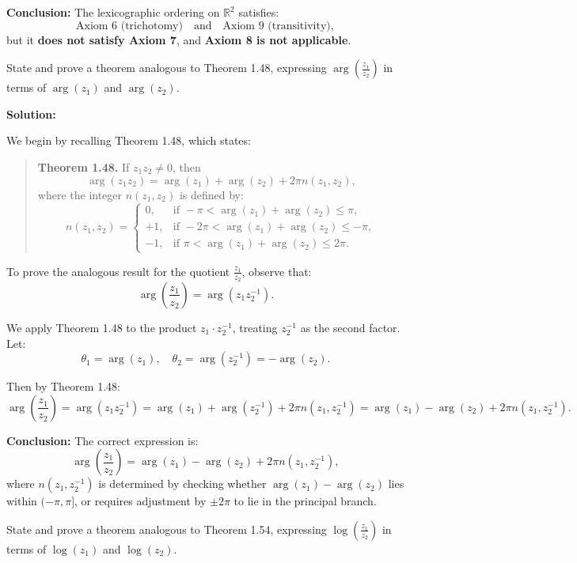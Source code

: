 \textbf{Conclusion:}  
The lexicographic ordering on \(\mathbb{R}^2\) satisfies:
\[
\text{Axiom 6 (trichotomy)} \quad \text{and} \quad \text{Axiom 9 (transitivity)},
\]
but it \textbf{does not satisfy Axiom 7}, and \textbf{Axiom 8 is not applicable}.

\begin{problembox}
State and prove a theorem analogous to Theorem 1.48, expressing \( \arg\left( \frac{z_1}{z_2} \right) \) in terms of \( \arg(z_1) \) and \( \arg(z_2) \).
\end{problembox}

\textbf{Solution:}  

We begin by recalling Theorem 1.48, which states:

\begin{quote}
\textbf{Theorem 1.48.}  
If \( z_1 z_2 \ne 0 \), then
\[
\arg(z_1 z_2) = \arg(z_1) + \arg(z_2) + 2\pi n(z_1, z_2),
\]
where the integer \( n(z_1, z_2) \) is defined by:
\[
n(z_1, z_2) =
\begin{cases}
0, & \text{if } -\pi < \arg(z_1) + \arg(z_2) \leq \pi, \\
+1, & \text{if } -2\pi < \arg(z_1) + \arg(z_2) \leq -\pi, \\
-1, & \text{if } \pi < \arg(z_1) + \arg(z_2) \leq 2\pi.
\end{cases}
\]
\end{quote}

To prove the analogous result for the quotient \( \frac{z_1}{z_2} \), observe that:
\[
\arg\left( \frac{z_1}{z_2} \right) = \arg(z_1 z_2^{-1}).
\]

We apply Theorem 1.48 to the product \( z_1 \cdot z_2^{-1} \), treating \( z_2^{-1} \) as the second factor. Let:
\[
\theta_1 = \arg(z_1), \quad \theta_2 = \arg(z_2^{-1}) = -\arg(z_2).
\]

Then by Theorem 1.48:
\[
\arg\left( \frac{z_1}{z_2} \right)
= \arg(z_1 z_2^{-1})
= \arg(z_1) + \arg(z_2^{-1}) + 2\pi n(z_1, z_2^{-1})
= \arg(z_1) - \arg(z_2) + 2\pi n(z_1, z_2^{-1}).
\]

\textbf{Conclusion:}  
The correct expression is:
\[
\arg\left( \frac{z_1}{z_2} \right) = \arg(z_1) - \arg(z_2) + 2\pi n(z_1, z_2^{-1}),
\]
where \( n(z_1, z_2^{-1}) \) is determined by checking whether \( \arg(z_1) - \arg(z_2) \) lies within \( (-\pi, \pi] \), or requires adjustment by \( \pm 2\pi \) to lie in the principal branch.

\begin{problembox}
State and prove a theorem analogous to Theorem 1.54, expressing \( \log\left( \frac{z_1}{z_2} \right) \) in terms of \( \log(z_1) \) and \( \log(z_2) \).
\end{problembox}

